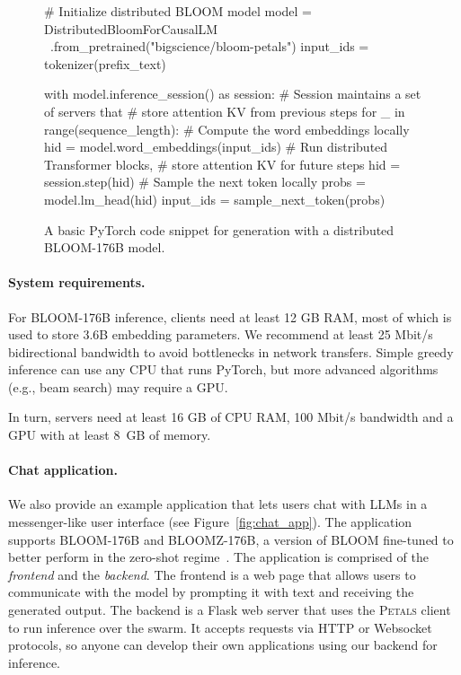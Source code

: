 
\begin{figure}[tb]
\small
\begin{pythoncode}
# Initialize distributed BLOOM model
model = DistributedBloomForCausalLM \
    .from_pretrained("bigscience/bloom-petals")
input_ids = tokenizer(prefix_text)

with model.inference_session() as session:
    # Session maintains a set of servers that
    # store attention KV from previous steps
    for _ in range(sequence_length):
        # Compute the word embeddings locally
        hid = model.word_embeddings(input_ids)
        # Run distributed Transformer blocks,
        # store attention KV for future steps
        hid = session.step(hid)
        # Sample the next token locally
        probs = model.lm_head(hid)
        input_ids = sample_next_token(probs)
\end{pythoncode}
    \vspace{-5pt}
    \caption{A basic PyTorch code snippet for generation with a distributed BLOOM-176B model.}
    \label{fig:infernce_snippet}
    \vspace{-10pt}
\end{figure}

\paragraph{System requirements.} For BLOOM-176B inference, clients need at least 12 GB RAM, most of which is used to store 3.6B embedding parameters. We recommend at least 25 Mbit/s bidirectional bandwidth to avoid bottlenecks in network transfers. Simple greedy inference can use any CPU that runs PyTorch, but more advanced algorithms (e.g., beam search) may require a GPU.

In turn, servers need at least 16 GB of CPU RAM, 100 Mbit/s bandwidth and a GPU with at least 8~GB of memory.

\paragraph{Chat application.} We also provide an example application that lets users chat with LLMs in a messenger-like user interface (see Figure~\ref{fig:chat_app}). The application supports BLOOM-176B and BLOOMZ-176B, a version of BLOOM fine-tuned to better perform in the zero-shot regime~\cite{bloomz}. The application is comprised of the \textit{frontend} and the \textit{backend}.
The frontend is a web page that allows users to communicate with the model by prompting it with text and receiving the generated output.
The backend is a Flask web server that uses the \textsc{Petals} client to run inference over the swarm. It accepts requests via HTTP or Websocket protocols, so anyone can develop their own applications using our backend for inference.

